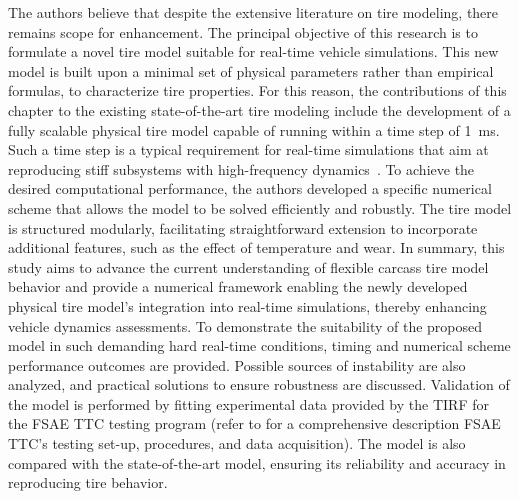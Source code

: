%

The authors believe that despite the extensive literature on tire modeling, there remains scope for enhancement. The principal objective of this research is to formulate a novel tire model suitable for real-time vehicle simulations. This new model is built upon a minimal set of physical parameters rather than empirical formulas, to characterize tire properties. For this reason, the contributions of this chapter to the existing state-of-the-art tire modeling include the development of a fully scalable physical tire model capable of running within a time step of \SI{1}{\milli\second}. Such a time step is a typical requirement for real-time simulations that aim at reproducing stiff subsystems with high-frequency dynamics~\cite{pacejka2012tire}. To achieve the desired computational performance, the authors developed a specific numerical scheme that allows the model to be solved efficiently and robustly. The tire model is structured modularly, facilitating straightforward extension to incorporate additional features, such as the effect of temperature and wear. In summary, this study aims to advance the current understanding of flexible carcass tire model behavior and provide a numerical framework enabling the newly developed physical tire model's integration into real-time simulations, thereby enhancing vehicle dynamics assessments. To demonstrate the suitability of the proposed model in such demanding hard real-time conditions, timing and numerical scheme performance outcomes are provided. Possible sources of instability are also analyzed, and practical solutions to ensure robustness are discussed. Validation of the model is performed by fitting experimental data provided by the \ac{TIRF} for the \ac{FSAE TTC} testing program (refer to \citet{kasprzak2006formula} for a comprehensive description \ac{FSAE TTC}'s testing set-up, procedures, and data acquisition). The model is also compared with the state-of-the-art \MagicFormulae{} model, ensuring its reliability and accuracy in reproducing tire behavior.

